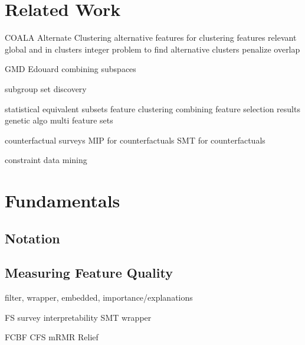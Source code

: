 \documentclass{article}
\begin{document}
\section{Related Work}
\label{sec:related-work}

COALA \cite{bae2006coala}
Alternate Clustering \cite{bailey2014alternative}
alternative features for clustering \cite{tao2012novel}
features relevant global and in clusters \cite{guan2011unified}
integer problem to find alternative clusters \cite{bae2010clustering}
penalize overlap \cite{mueller2009relevant}

GMD \cite{trittenbach2019dimension}
Edouard \cite{fouche2021efficient}
combining subspaces \cite{nguyen20134s}

subgroup set discovery \cite{leeuwen2012diverse}

statistical equivalent subsets \cite{lagani2017feature, borboudakis2021extending, tsamardinos2003towards, dougherty2006number}
feature clustering \cite{mueller2021feature}
combining feature selection results \cite{woznica2012model}
genetic algo multi feature sets \cite{siddiqi2020genetic}

counterfactual surveys \cite{verma2020counterfactual, stepin2021survey}
MIP for counterfactuals \cite{mohammadi2021scaling}
SMT for counterfactuals \cite{karimi2020model}

constraint data mining \cite{grossi2017survey}

\section{Fundamentals}
\label{sec:fundamentals}

\subsection{Notation}

\subsection{Measuring Feature Quality}

filter, wrapper, embedded, importance/explanations

FS survey \cite{li2017feature, chandrashekar2014survey, guyon2003introduction}
interpretability \cite{carvalho2019machine}
SMT \cite{barrett2018satisfiability}
wrapper \cite{kohavi1997wrappers}

FCBF \cite{yu2003feature}
CFS \cite{hall1999correlation}
mRMR \cite{peng2005feature}
Relief \cite{kira1992feature}
\end{document}
